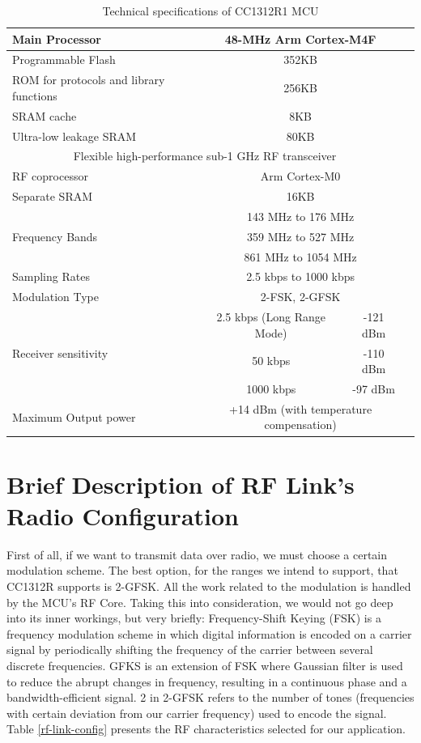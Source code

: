 \begin{table}
\centering
\caption{Technical specifications of CC1312R1 MCU \cite{cc1312}}
\label{table1}
\begin{tabular}{|l|p{1cm}p{1cm}p{1cm}|}
\hline 
Main Processor & \multicolumn{2}{|c|}{48-MHz Arm Cortex-M4F} \tabularnewline \hline 
Programmable Flash & \multicolumn{2}{|c|}{352KB} \tabularnewline \hline 
ROM for protocols and library functions & \multicolumn{2}{|c|}{256KB} \tabularnewline \hline 
SRAM cache & \multicolumn{2}{|c|}{8KB} \tabularnewline \hline 
Ultra-low leakage SRAM & \multicolumn{2}{|c|}{80KB} \tabularnewline \hline 
\multicolumn{3}{|c|}{ Flexible high-performance sub-1 GHz RF transceiver } \tabularnewline \hline 
RF coprocessor & \multicolumn{2}{|c|}{Arm Cortex-M0} \tabularnewline \hline 
Separate SRAM & \multicolumn{2}{|c|}{16KB} \tabularnewline \hline
\multirow{3}{*}{Frequency Bands} & \multicolumn{2}{|c|}{143 MHz to 176 MHz}  \tabularnewline
{} &  \multicolumn{2}{|c|}{359 MHz to 527 MHz} \tabularnewline 
{} &  \multicolumn{2}{|c|}{861 MHz to 1054 MHz} \tabularnewline \hline
Sampling Rates & \multicolumn{2}{|c|}{2.5 kbps to 1000 kbps} \tabularnewline \hline 
Modulation Type & \multicolumn{2}{|c|}{2-FSK, 2-GFSK} \tabularnewline \hline 
\multirow{3}{*}{Receiver sensitivity} & \multicolumn{1}{|c|}{2.5 kbps (Long Range Mode)} &  \multicolumn{1}{|c|}{-121 dBm} \tabularnewline 
{} & \multicolumn{1}{|c|}{50 kbps} & \multicolumn{1}{|c|}{-110 dBm} \tabularnewline
{} & \multicolumn{1}{|c|}{1000 kbps} & \multicolumn{1}{|c|}{-97 dBm} \tabularnewline \hline 
Maximum Output power & \multicolumn{2}{|c|}{+14 dBm \newline (with temperature compensation)} \tabularnewline \hline  
\end{tabular}
\end{table}

\newpage

\section{Brief Description of RF Link's Radio Configuration}

First of all, if we want to transmit data over radio, we must choose a certain modulation scheme. The best option, for the ranges we intend to support, that CC1312R supports is 2-GFSK. All the work related to the modulation is handled by the MCU’s RF Core.
Taking this into consideration, we would not go deep into its inner workings, but very briefly: Frequency-Shift Keying (FSK) is a frequency modulation scheme in which digital information is encoded on a carrier signal by periodically shifting the frequency of the carrier between several discrete frequencies. GFKS is an extension of FSK where Gaussian filter is used to reduce the abrupt changes in frequency, resulting in a continuous phase and a bandwidth-efficient signal. 2 in 2-GFSK refers to the number of tones (frequencies with certain deviation from our carrier frequency) used to encode the signal. Table \ref{rf-link-config} presents the RF characteristics selected for our application. 

